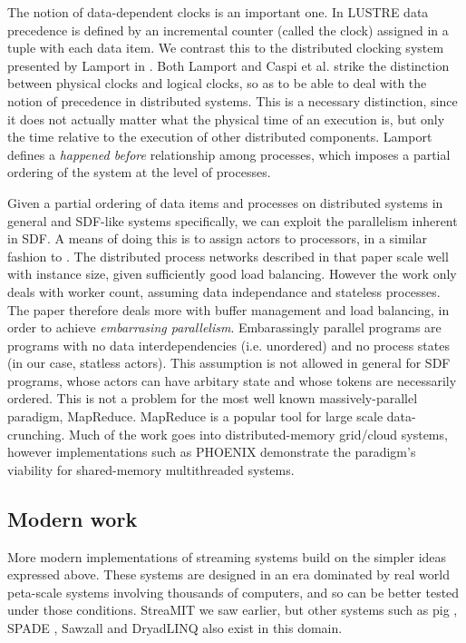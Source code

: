 The notion of data-dependent clocks is an important one.
In LUSTRE data precedence is defined by an incremental counter (called the clock) assigned in a tuple with each data item.
We contrast this to the distributed clocking system presented by Lamport in \cite{lam78}.
Both Lamport and Caspi et al. strike the distinction between physical clocks and logical clocks, so as to be able to deal with the notion of precedence in distributed systems.
This is a necessary distinction, since it does not actually matter what the physical time of an execution is, but only the time relative to the execution of other distributed components.
Lamport defines a {\em happened before} relationship among processes, which imposes a partial ordering of the system at the level of processes.

Given a partial ordering of data items and processes on distributed systems in general and SDF-like systems specifically, we can exploit the parallelism inherent in SDF.
A means of doing this is to assign actors to processors, in a similar fashion to \cite{par03}.
The distributed process networks described in that paper scale well with instance size, given sufficiently good load balancing.
However the work only deals with worker count, assuming data independance and stateless processes.
The paper therefore deals more with buffer management and load balancing, in order to achieve {\em embarrasing parallelism}.
Embarassingly parallel programs are programs with no data interdependencies (i.e. unordered) and no process states (in our case, statless actors).
This assumption is not allowed in general for SDF programs, whose actors can have arbitary state and whose tokens are necessarily ordered.
This is not a problem for the most well known massively-parallel paradigm, MapReduce.
MapReduce \cite{dea08} is a popular tool for large scale data-crunching.
Much of the work goes into distributed-memory grid/cloud systems, however implementations such as PHOENIX \cite{ran07} demonstrate the paradigm's viability for shared-memory multithreaded systems.

\subsection{Modern work}

More modern implementations of streaming systems build on the simpler ideas expressed above.
These systems are designed in an era dominated by real world peta-scale systems involving thousands of computers, and so can be better tested under those conditions.
StreaMIT \cite{thies01, thies02, thies10} we saw earlier, but other systems such as pig \cite{ols08}, SPADE \cite{ged08}, Sawzall \cite{pik05} and DryadLINQ \cite{yu08} also exist in this domain.

